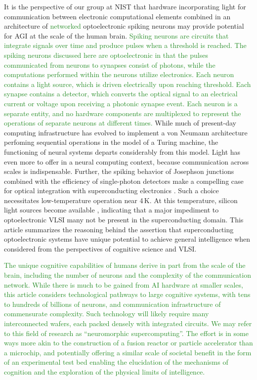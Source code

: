 \documentclass[twocolumn]{article}
\begin{document}
It is the perspective of our group at NIST that hardware incorporating light for communication between electronic computational elements combined in an architecture of \textcolor{ForestGreen}{networked} optoelectronic spiking neurons may provide potential for AGI at the scale of the human brain. \textcolor{ForestGreen}{Spiking neurons are circuits that integrate signals over time and produce pulses when a threshold is reached. The spiking neurons discussed here are optoelectronic in that the pulses communicated from neurons to synapses consist of photons, while the computations performed within the neurons utilize electronics. Each neuron contains a light source, which is driven electrically upon reaching threshold. Each synapse contains a detector, which converts the optical signal to an electrical current or voltage upon receiving a photonic synapse event. Each neuron is a separate entity, and no hardware components are multiplexed to represent the operations of separate neurons at different times.} While much of present-day computing infrastructure has evolved to implement a von Neumann architecture perfoming sequential operations in the model of a Turing machine, the functioning of neural systems departs considerably from this model. Light has even more to offer in a neural computing context, because communication across scales is indispensable. Further, the spiking behavior of Josephson junctions combined with the efficiency of single-photon detectors make a compelling case for optical integration with superconducting electronics \cite{shbu2017,sh2018}. Such a choice necessitates low-temperature operation near 4\,K. At this temperature, silicon light sources become available \cite{buch2017}, indicating that a major impediment to optoelectronic VLSI many not be present in the superconducting domain. This article summarizes the reasoning behind the assertion that superconducting optoelectronic systems have unique potential to achieve general intelligence when considered from the perspectives of cognitive science and VLSI.

\textcolor{ForestGreen}{The unique cognitive capabilities of humans derive in part from the scale of the brain, including the number of neurons and the complexity of the communication network. While there is much to be gained from AI hardware at smaller scales, this article considers technological pathways to large cognitive systems, with tens to hundreds of billions of neurons, and communication infrastructure of commensurate complexity. Such technology will likely require many interconnected wafers, each packed densely with integrated circuits. We may refer to this field of research as ``neuromorphic supercomputing''. The effort is in some ways more akin to the construction of a fusion reactor or particle accelerator than a microchip, and potentially offering a similar scale of societal benefit in the form of an experimental test bed enabling the elucidation of the mechanisms of cognition and the exploration of the physical limits of intelligence.}
\end{document}
